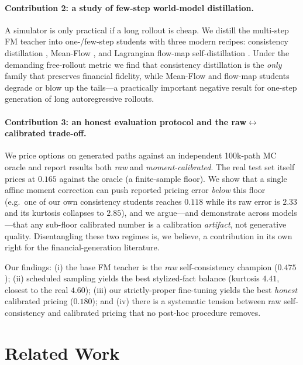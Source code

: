 \documentclass[11pt]{article}
\begin{document}
\paragraph{Contribution 2: a study of few-step world-model distillation.}
A simulator is only practical if a long rollout is cheap. We distill the
multi-step FM teacher into one-/few-step students with three modern recipes:
consistency distillation \citep{song2023consistency,song2024improved}, Mean-Flow
\citep{geng2025meanflow}, and Lagrangian flow-map self-distillation
\citep{boffi2025flowmaps}. Under the demanding free-rollout metric we find that
consistency distillation is the \emph{only} family that preserves financial
fidelity, while Mean-Flow and flow-map students degrade or blow up the tails---a
practically important negative result for one-step generation of long
autoregressive rollouts.

\paragraph{Contribution 3: an honest evaluation protocol and the
raw$\leftrightarrow$calibrated trade-off.} We price options on generated paths
against an independent 100k-path MC oracle and report results both \emph{raw} and
\emph{moment-calibrated}. The real test set itself prices at $0.165$ against the
oracle (a finite-sample floor). We show that a single affine moment correction can
push reported pricing error \emph{below} this floor (e.g.\ one of our own
consistency students reaches $0.118$ while its raw error is $2.33$ and its
kurtosis collapses to $2.85$), and we argue---and demonstrate across models---that
any sub-floor calibrated number is a calibration \emph{artifact}, not generative
quality. Disentangling these two regimes is, we believe, a contribution in its own
right for the financial-generation literature.

Our findings: (i) the base FM teacher is the \emph{raw} self-consistency champion
($0.475$); (ii) scheduled sampling yields the best stylized-fact balance
(kurtosis $4.41$, closest to the real $4.60$); (iii) our strictly-proper
fine-tuning yields the best \emph{honest} calibrated pricing ($0.180$); and (iv)
there is a systematic tension between raw self-consistency and calibrated pricing
that no post-hoc procedure removes.

\section{Related Work}
\label{sec:related}
\end{document}
